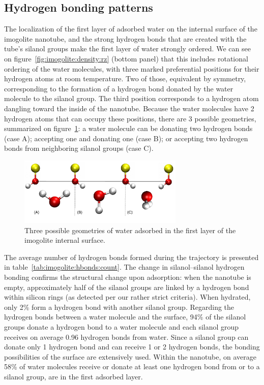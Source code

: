 \documentclass[thesis]{subfiles}
\begin{document}
\FloatBarrier
\subsection{Hydrogen bonding patterns}

The localization of the first layer of adsorbed water on the internal surface of
the imogolite nanotube, and the strong hydrogen bonds that are created with the
tube's silanol groups make the first layer of water strongly ordered. We can see
on figure~\ref{fig:imogolite:density:rz} (bottom panel) that this includes
rotational ordering of the water molecules, with three marked preferential
positions for their hydrogen atoms at room temperature. Two of those, equivalent
by symmetry, corresponding to the formation of a hydrogen bond donated by the
water molecule to the silanol group. The third position corresponds to a
hydrogen atom dangling toward the inside of the nanotube. Because the water
molecules have 2 hydrogen atoms that can occupy these positions, there are 3
possible geometries, summarized on figure~\ref{fig:imogolite:hbonds:surface}: a
water molecule can be donating two hydrogen bonds (case A); accepting one and
donating one (case B); or accepting two hydrogen bonds from neighboring silanol
groups (case C).

\begin{figure}[ht]
    \centering
    \includegraphics[width=0.7\textwidth]{figures/images/imogolite-hbonds-surface}
	\caption{Three possible geometries of water adsorbed in the first layer of
    the imogolite internal surface.}
    \label{fig:imogolite:hbonds:surface}
\end{figure}

The average number of hydrogen bonds formed during the trajectory is presented
in table~\ref{tab:imogolite:hbonds:count}. The change in silanol--silanol
hydrogen bonding confirms the structural change upon adsorption: when the
nanotube is empty, approximately half of the silanol groups are linked by a
hydrogen bond within silicon rings (as detected per our rather strict criteria).
When hydrated, only 2\% form a hydrogen bond with another silanol group.
Regarding the hydrogen bonds between a water molecule and the surface, 94\% of
the silanol groups donate a hydrogen bond to a water molecule and each silanol
group receives on average 0.96 hydrogen bonds from water. Since a silanol group
can donate only 1 hydrogen bond and can receive 1 or 2 hydrogen bonds, the
bonding possibilities of the surface are extensively used. Within the nanotube,
on average 58\% of water molecules receive or donate at least one hydrogen bond
from or to a silanol group, \ie are in the first adsorbed layer.
\end{document}
